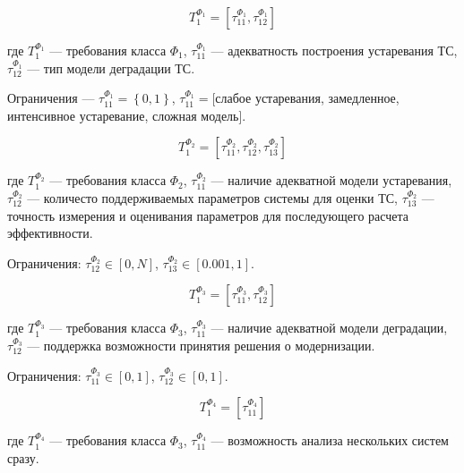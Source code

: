 \begin{equation}
    \label{eq:formal_requirements_1}
    T^{\Phi_1}_1=[\tau^{\Phi_1}_{11},\tau^{\Phi_1}_{12}]
\end{equation}
\vspace{\baselineskip}

\noindent
где $T^{\Phi_1}_1$ --- требования класса $\Phi_1$,
$\tau^{\Phi_1}_{11}$ --- адекватность построения устаревания ТС,
$\tau^{\Phi_1}_{12}$ --- тип модели деградации ТС.

Ограничения --- $\tau^{\Phi_1}_{11} = \left\{ 0,1 \right\}$,
$\tau^{\Phi_1}_{11} = $[слабое устаревания, замедленное, интенсивное устаревание, сложная модель].

\begin{equation}
    \label{eq:formal_requirements_2}
    T^{\Phi_2}_1=[\tau^{\Phi_2}_{11},\tau^{\Phi_2}_{12},\tau^{\Phi_2}_{13}]
\end{equation}
\vspace{\baselineskip}

\noindent
где $T^{\Phi_2}_1$ --- требования класса $\Phi_2$,
$\tau^{\Phi_2}_{11}$ --- наличие адекватной модели устаревания,
$\tau^{\Phi_2}_{12}$ --- количесто поддерживаемых параметров системы для оценки ТС,
$\tau^{\Phi_2}_{13}$ --- точность измерения и оценивания параметров для последующего расчета эффективности.

Ограничения: $\tau^{\Phi_2}_{12} \in [0,N]$,
$\tau^{\Phi_2}_{13} \in [0.001,1]$.

\begin{equation}
    \label{eq:formal_requirements_3}
    T^{\Phi_3}_1=[\tau^{\Phi_3}_{11},\tau^{\Phi_3}_{12}]
\end{equation}
\vspace{\baselineskip}

\noindent
где $T^{\Phi_3}_1$ --- требования класса $\Phi_3$,
$\tau^{\Phi_3}_{11}$ --- наличие адекватной модели деградации,
$\tau^{\Phi_3}_{12}$ --- поддержка возможности принятия решения о модернизации.

Ограничения: $\tau^{\Phi_3}_{11} \in [0,1]$,
$\tau^{\Phi_3}_{12} \in [0,1]$.

\begin{equation}
    \label{eq:formal_requirements_4}
    T^{\Phi_4}_1=[\tau^{\Phi_4}_{11}]
\end{equation}
\vspace{\baselineskip}

\noindent
где $T^{\Phi_4}_1$ --- требования класса $\Phi_3$,
$\tau^{\Phi_4}_{11}$ --- возможность анализа нескольких систем сразу.

